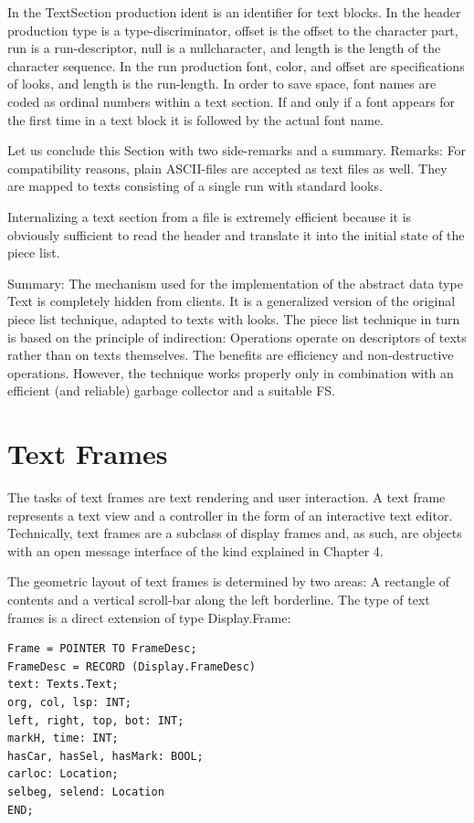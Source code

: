 In the TextSection production ident is an identifier for text blocks. In the header production type is a
type-discriminator, offset is the offset to the character part, run is a run-descriptor, null is a nullcharacter, and length is the length of the character sequence. In the run production font, color, and
offset are specifications of looks, and length is the run-length. In order to save space, font names
are coded as ordinal numbers within a text section. If and only if a font appears for the first time in a
text block it is followed by the actual font name.

Let us conclude this Section with two side-remarks and a summary.
Remarks:
For compatibility reasons, plain ASCII-files are accepted as text files as well. They are mapped
to texts consisting of a single run with standard looks.

Internalizing a text section from a file is extremely efficient because it is obviously sufficient to
read the header and translate it into the initial state of the piece list.

Summary: The mechanism used for the implementation of the abstract data type Text is completely
hidden from clients. It is a generalized version of the original piece list technique, adapted to texts
with looks. The piece list technique in turn is based on the principle of indirection: Operations
operate on descriptors of texts rather than on texts themselves. The benefits are efficiency and
non-destructive operations. However, the technique works properly only in combination with an
efficient (and reliable) garbage collector and a suitable FS.

\section{Text Frames}
\label{sec:textframes}
The tasks of text frames are text rendering and user interaction. A text frame represents a text view
and a controller in the form of an interactive text editor. Technically, text frames are a subclass of
display frames and, as such, are objects with an open message interface of the kind explained in
Chapter 4.

The geometric layout of text frames is determined by two areas: A rectangle of contents and a
vertical scroll-bar along the left borderline. The type of text frames is a direct extension of type
Display.Frame:
\begin{verbatim}
Frame = POINTER TO FrameDesc;
FrameDesc = RECORD (Display.FrameDesc)
text: Texts.Text;
org, col, lsp: INT;
left, right, top, bot: INT;
markH, time: INT;
hasCar, hasSel, hasMark: BOOL;
carloc: Location;
selbeg, selend: Location
END;
\end{verbatim}

